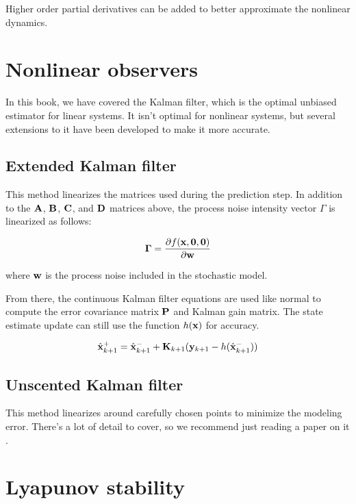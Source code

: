 Higher order partial derivatives can be added to better approximate the
nonlinear dynamics.

\section{Nonlinear observers}

In this book, we have covered the Kalman filter, which is the optimal unbiased
estimator for linear systems. It isn't optimal for nonlinear systems, but
several extensions to it have been developed to make it more accurate.

\subsection{Extended Kalman filter}

This method linearizes the matrices used during the prediction step. In addition
to the $\mathbf{A}$, $\mathbf{B}$, $\mathbf{C}$, and $\mathbf{D}$ matrices above, the
process noise intensity vector $\Gamma$ is linearized as follows:

\begin{equation*}
  \mathbf{\Gamma} = \frac{\partial f(\mathbf{x}, \mathbf{0}, \mathbf{0})}{\partial \mathbf{w}}
\end{equation*}

where $\mathbf{w}$ is the process noise included in the stochastic model.

From there, the continuous Kalman filter equations are used like normal to
compute the error covariance matrix $\mathbf{P}$ and Kalman gain matrix. The state
estimate update can still use the function $h(\mathbf{x})$ for accuracy.

\begin{equation*}
  \hat{\mathbf{x}}_{k+1}^+ = \hat{\mathbf{x}}_{k+1}^- +
    \mathbf{K}_{k+1}(\mathbf{y}_{k+1} - h(\hat{\mathbf{x}}_{k+1}^-))
\end{equation*}

\subsection{Unscented Kalman filter}

This method linearizes around carefully chosen points to minimize the modeling
error. There's a lot of detail to cover, so we recommend just reading a paper on
it \cite{bib:unscented-kalman-filter}.

\section{Lyapunov stability}

